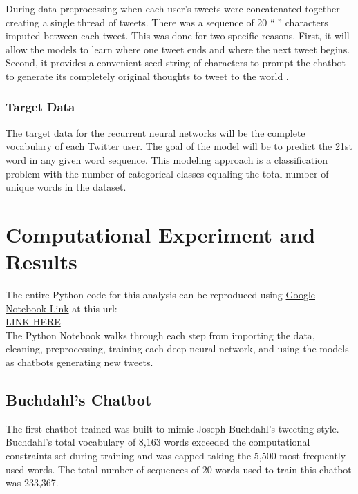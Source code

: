 \documentclass[5p,authoryear]{elsarticle}
\begin{document}
During data preprocessing when each user’s tweets were concatenated together creating a single thread of tweets. There was a sequence of 20 “|” characters imputed between each tweet. This was done for two specific reasons. First, it will allow the models to learn where one tweet ends and where the next tweet begins. Second, it provides a convenient seed string of characters to prompt the chatbot to generate its completely original thoughts to tweet to the world \citep{foster}.


\subsubsection{Target Data}

The target data for the recurrent neural networks will be the complete vocabulary of each Twitter user. The goal of the model will be to predict the 21st word in any given word sequence. This modeling approach is a classification problem with the number of categorical classes equaling the total number of unique words in the dataset.


\section{Computational Experiment and Results}

The entire Python code for this analysis can be reproduced using \href{https://colab.research.google.com/drive/1CdjdEu8AULUHHh4gCXqsHzZDwCDKx2Rf}{Google Notebook Link} at this url:\\

\href{https://colab.research.google.com/drive/1CdjdEu8AULUHHh4gCXqsHzZDwCDKx2Rf}{LINK HERE} \\


The Python Notebook walks through each step from importing the data, cleaning, preprocessing, training each deep neural network, and using the models as chatbots generating new tweets.


\subsection{Buchdahl’s Chatbot}

The first chatbot trained was built to mimic Joseph Buchdahl’s tweeting style. Buchdahl’s total vocabulary of 8,163 words exceeded the computational constraints set during training and was capped taking the 5,500 most frequently used words. The total number of sequences of 20 words used to train this chatbot was 233,367.
\end{document}

